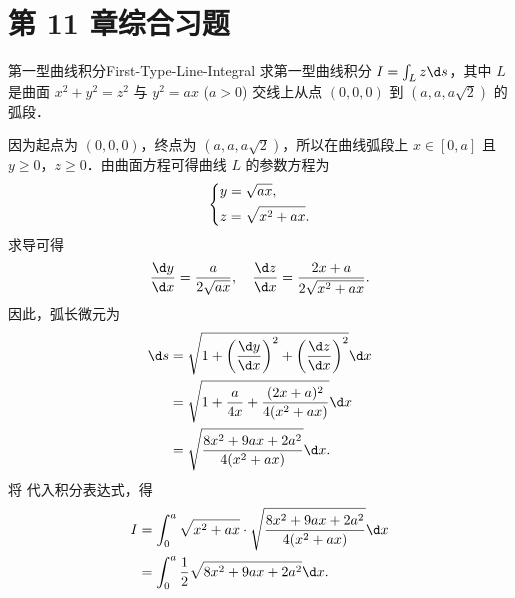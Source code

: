 \section{第 11 章综合习题}

\begin{problem}{第一型曲线积分}{First-Type-Line-Integral}
    求第一型曲线积分 $I = \int_{L} z \d s$，其中 $L$ 是曲面 $x^2 + y^2 = z^2$ 与 $y^2 = ax$ ($a > 0$) 交线上从点 $(0,0,0)$ 到 $(a, a, a\sqrt{2})$ 的弧段．
\end{problem}

\begin{solution}
    因为起点为 $(0,0,0)$，终点为 $(a, a, a\sqrt{2})$，所以在曲线弧段上 $x \in [0, a]$ 且 $y \ge 0$，$z \ge 0$．由曲面方程可得曲线 $L$ 的参数方程为
    \begin{equation}
        \label{eq:param-1}
        \begin{dcases}
            y = \sqrt{ax}, \\
            z = \sqrt{x^2 + ax}.
        \end{dcases}
    \end{equation}
    求导可得
    \begin{equation}
        \label{eq:deriv-1}
        \frac{\d y}{\d x} = \frac{a}{2\sqrt{ax}}, \quad \frac{\d z}{\d x} = \frac{2x+a}{2\sqrt{x^2+ax}}.
    \end{equation}
    因此，弧长微元为
    \begin{equation}
        \label{eq:ds-1}
        \begin{aligned}
            \d s & = \sqrt{1 + \left(\frac{\d y}{\d x}\right)^2 + \left(\frac{\d z}{\d x}\right)^2} \d x \\
                 & = \sqrt{1 + \frac{a}{4x} + \frac{(2x+a)^2}{4(x^2+ax)}} \d x                           \\
                 & = \sqrt{\frac{8x^2 + 9ax + 2a^2}{4(x^2+ax)}} \d x.
        \end{aligned}
    \end{equation}
    将  代入积分表达式，得
    \begin{equation}
        \label{eq:integral-1}
        \begin{aligned}
            I & = \int_{0}^{a} \sqrt{x^2 + ax} \cdot \sqrt{\frac{8x^2 + 9ax + 2a^2}{4(x^2+ax)}} \d x \\
              & = \int_{0}^{a} \frac{1}{2} \sqrt{8x^2 + 9ax + 2a^2} \d x.
        \end{aligned}
    \end{equation}

\end{solution}
